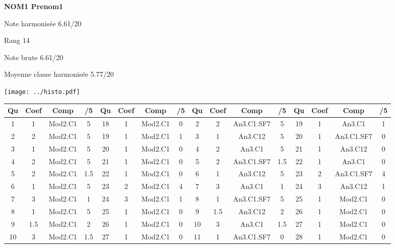 \begin{minipage}[c]{.45\linewidth} 
\Large \textbf{\textsf{NOM1 Prenom1}} 
 
 \normalsize Note harmonisée 6.61/20 
 
Rang 14
 
Note brute 6.61/20 
 
Moyenne classe harmonisée 5.77/20 
 
\end{minipage}\hfill 
\begin{minipage}[c]{.45\linewidth}  
\begin{center}
\texttt{[image: ../histo.pdf]} 
\end{center}
\end{minipage}
\vspace{.cm}
\footnotesize 
\begin{center} 
\begin{tabular}{|c|c|c|c||c|c|c|c||c|c|c|c||c|c|c|c|} 
\hline \textbf{Qu} & \textbf{Coef} & \textbf{Comp} & \textbf{/5} & \textbf{Qu} & \textbf{Coef} & \textbf{Comp} & \textbf{/5} & \textbf{Qu} & \textbf{Coef} & \textbf{Comp} & \textbf{/5} & \textbf{Qu} & \textbf{Coef} & \textbf{Comp} & \textbf{/5} \\ 
\hline 
\hline 
1 & 1 & Mod2.C1 & 5 & 18 & 1 & Mod2.C1 & 0 & 2 & 2 & An3.C1.SF7 & 5 & 19 & 1 & An3.C1 & 1 \\ \hline 
2 & 2 & Mod2.C1 & 5 & 19 & 1 & Mod2.C1 & 1 & 3 & 1 & An3.C12 & 5 & 20 & 1 & An3.C1.SF7 & 0 \\ \hline 
3 & 1 & Mod2.C1 & 5 & 20 & 1 & Mod2.C1 & 0 & 4 & 2 & An3.C1 & 5 & 21 & 1 & An3.C12 & 0 \\ \hline 
4 & 2 & Mod2.C1 & 5 & 21 & 1 & Mod2.C1 & 0 & 5 & 2 & An3.C1.SF7 & 1.5 & 22 & 1 & An3.C1 & 0 \\ \hline 
5 & 2 & Mod2.C1 & 1.5 & 22 & 1 & Mod2.C1 & 0 & 6 & 1 & An3.C12 & 5 & 23 & 2 & An3.C1.SF7 & 4 \\ \hline 
6 & 1 & Mod2.C1 & 5 & 23 & 2 & Mod2.C1 & 4 & 7 & 3 & An3.C1 & 1 & 24 & 3 & An3.C12 & 1 \\ \hline 
7 & 3 & Mod2.C1 & 1 & 24 & 3 & Mod2.C1 & 1 & 8 & 1 & An3.C1.SF7 & 5 & 25 & 1 & Mod2.C1 & 0 \\ \hline 
8 & 1 & Mod2.C1 & 5 & 25 & 1 & Mod2.C1 & 0 & 9 & 1.5 & An3.C12 & 2 & 26 & 1 & Mod2.C1 & 0 \\ \hline 
9 & 1.5 & Mod2.C1 & 2 & 26 & 1 & Mod2.C1 & 0 & 10 & 3 & An3.C1 & 1.5 & 27 & 1 & Mod2.C1 & 0 \\ \hline 
10 & 3 & Mod2.C1 & 1.5 & 27 & 1 & Mod2.C1 & 0 & 11 & 1 & An3.C1.SF7 & 0 & 28 & 1 & Mod2.C1 & 0 \\ \hline 

\end{tabular}
\end{center}

